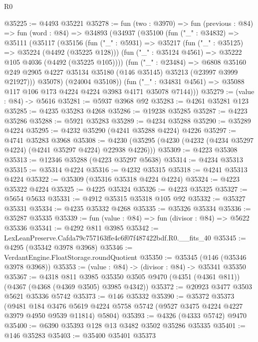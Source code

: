 \begin{lexlean}{R0}
\begin{coremodule}
@35225 := @4493 @35221
@35278 := fun (two : @3970) =>
  fun (previous : @84) =>
  fun (word : @84) =>
  @34893
    (@34937
      (@35100
        (fun ("_" : @34832) =>
        @35111
          (@35117
            (@35156
              (fun ("_" : @5931) =>
              @35217
                (fun ("_" : @35125) => @35224 (@4492 (@35225 @128)))
                (fun ("_" : @35124 @4561) => @35222 @105 @4036 (@4492 (@35225 @105))))
              (fun ("_" : @23484) =>
              @6808
                @35160
                @249
                @2905
                @4227
                @35134
                @35180
                (@146 @35145)
                @35213
                (@23997 @3999 @21927)))
            @35078)
          (@24004 @35108))
        (fun ("_" : @34831 @4561) => @35088 @117 @106 @173 @4224 @4224 @3983 @4171 @35078 @7144)))
@35279 := (value : @84) -> @5616
@35281 := @5937 @3968 @92
@35283 := @4261 @35281 @123
@35285 := @4235 @35283 @4268
@35286 := @19238 @35285
@35287 := @4223 @35286
@35288 := @5921 @35283
@35289 := @4234 @35288
@35290 := @35289 @4224
@35295 := @4232 @35290 (@4241 @35288 @4224) @4226
@35297 := @4741 @35283 @3968
@35308 := @4230 (@35295 (@4230 (@4232 (@4234 @35297 @4224) (@4241 @35297 @4224) @22938 @4226)))
@35309 := @4223 @35308
@35313 := @12346 @35288 (@4223 @35297 @5638)
@35314 := @4234 @35313
@35315 := @35314 @4224
@35316 := @4232 @35315
@35318 := @4241 @35313 @4224
@35322 := @35309 (@35316 @35318 @4224 @4224)
@35324 := @4223 @35322 @4224
@35325 := @4225 @35324
@35326 := @4223 @35325
@35327 := @5654 @5633
@35331 := @4912 @35315 @35318 @105 @92
@35332 := @35327 @35331
@35334 := @4235 @35332 @4268
@35335 := @35326 @35334
@35336 := @35287 @35335
@35339 := fun (value : @84) => fun (divisor : @84) => @5622 @35336
@35341 := @4292 @811 @3985
@35342 := LexLeanPreserve.Cafda79c757163ffe4c6f07f487422bdf.R0.__fits_40
@35345 := @4295 (@35342 @3978 @3968)
@35346 := VerdantEngine.FloatStorage.roundQuotient
@35350 := @35345 (@146 (@35346 @3978 @3968))
@35353 := (value : @84) -> (divisor : @84) -> @35341 @35350
@35367 := @4318
    @811
    @3985
    @35350
    @3505
    @9470
    (@4351 (@4361 @811))
    (@4367 (@4368 (@4369 @3505) @3985 @4342))
@35372 := @20923 @3477 @3503 @5621 @35336 @5742
@35373 := @146 @35332
@35390 := @35372
    @35373
    (@9481
      @184
      @3476
      @5619
      @4224
      @5758
      @5742
      (@9527 @3475 @4224 @4227 @3979 @4950 @9539 @11814)
      @5804)
@35393 := @4326 (@4333 @5742) @9470
@35400 := @6390 @35393 @128 @13 @3482 @3502 @35286 @35335
@35401 := @146 @35283
@35403 := @35400 @35401 @35373

\end{coremodule}
\end{lexlean}
